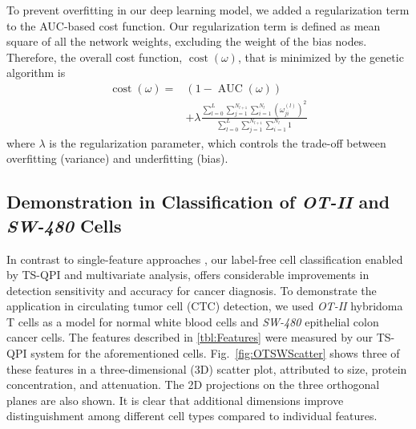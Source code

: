 \documentclass[aps,pra,reprint,longbibliography,superscriptaddress]{revtex4-1}
\DeclareMathOperator{\AUC}{AUC} %
\DeclareMathOperator{\cost}{cost} %
\begin{document}
To prevent overfitting in our deep learning model, we added a regularization term to the AUC-based cost function. Our regularization term is defined as mean square of all the network weights, excluding the weight of the bias nodes. Therefore, the overall cost function, $\cost(\omega)$, that is minimized by the genetic algorithm is
\begin{equation}
\begin{split}
\cost(\omega) = & (1 - \AUC(\omega)) \\
& + \lambda \frac{\sum_{l=0}^{L} \sum_{j=1}^{N_{l+1}} \sum_{i=1}^{N_l} (\omega_{ji}^{(l)})^2}{\sum_{l=0}^{L} \sum_{j=1}^{N_{l+1}} \sum_{i=1}^{N_l} 1}
\end{split}
\end{equation}
where $\lambda$ is the regularization parameter, which controls the trade-off between overfitting (variance) and underfitting (bias).

\subsection{Demonstration in Classification of \textit{OT-II} and \textit{SW-480} Cells}

In contrast to single-feature approaches \cite{nagrath2007isolation, vona2000isolation, kling2012beyond}, our label-free cell classification enabled by TS-QPI and multivariate analysis, offers considerable improvements in detection sensitivity and accuracy for cancer diagnosis. To demonstrate the application in circulating tumor cell (CTC) detection, we used \textit{OT-II} hybridoma T cells as a model for normal white blood cells and \textit{SW-480} epithelial colon cancer cells. The features described in \ref{tbl:Features} were measured by our TS-QPI system for the aforementioned cells. Fig.~\ref{fig:OTSWScatter} shows three of these features in a three-dimensional (3D) scatter plot, attributed to size, protein concentration, and attenuation. The 2D projections on the three orthogonal planes are also shown. It is clear that additional dimensions improve distinguishment among different cell types compared to individual features.
\end{document}
